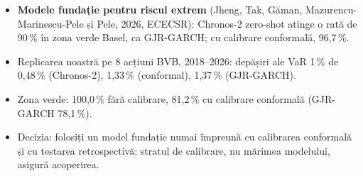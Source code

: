 \begin{itemize}\setlength{\itemsep}{2pt}
  \item \textbf{Modele fundație pentru riscul extrem} (Jheng, Tak, Găman, Mazurencu-Marinescu-Pele și Pele, 2026, ECECSR): Chronos-2 zero-shot atinge o rată de 90\,\% în zona verde Basel, ca GJR-GARCH; cu calibrare conformală, 96,7\,\%.
  \item Replicarea noastră pe 8 acțiuni BVB, 2018--2026: depășiri ale VaR 1\,\% de 0,48\,\% (Chronos-2), 1,33\,\% (conformal), 1,37\,\% (GJR-GARCH).
  \item Zona verde: 100,0\,\% fără calibrare, 81,2\,\% cu calibrare conformală (GJR-GARCH 78,1\,\%).
  \item Decizia: folosiți un model fundație numai împreună cu calibrarea conformală și cu testarea retrospectivă; stratul de calibrare, nu mărimea modelului, asigură acoperirea.
\end{itemize}
